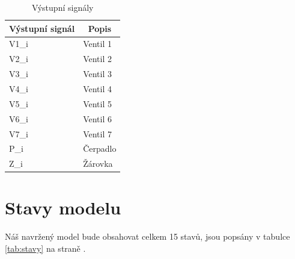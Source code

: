 \documentclass[12pt]{report}
\begin{document}
	\begin{table}[]
		\centering
		\begin{tabular}{ll}
			\hline
			\multicolumn{1}{c}{Výstupní signál} 	& \multicolumn{1}{c}{Popis}  	\\ \hline
			V1\_i          					  	& Ventil 1      			   	\\
			V2\_i         					  	& Ventil 2      				\\
			V3\_i          					  	& Ventil 3      				\\
			V4\_i          					  	& Ventil 4      				\\
			V5\_i          					  	& Ventil 5      				\\
			V6\_i          					  	& Ventil 6      				\\
			V7\_i          					  	& Ventil 7      				\\
			P\_i          					  	& Čerpadlo      				\\
			Z\_i          					  	& Žárovka      					\\ \hline
		\end{tabular}
		\caption{Výstupní signály}
		\label{tab:vystupni}
	\end{table}	

	\section{Stavy modelu}
	Náš navržený model bude obsahovat celkem 15 stavů, jsou popsány v tabulce \ref{tab:stavy} na straně \pageref{tab:stavy}.
			
\end{document}
